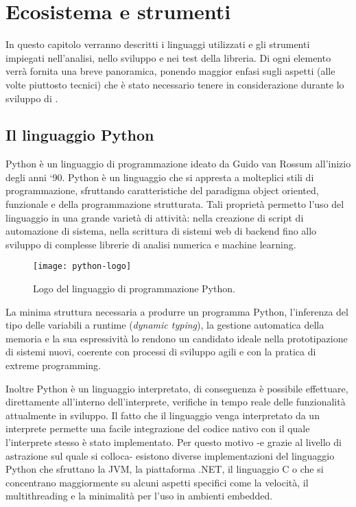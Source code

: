 \chapter{Ecosistema e strumenti}
\label{ch:ecosistema}
In questo capitolo verranno descritti i linguaggi utilizzati e gli
strumenti impiegati nell'analisi, nello sviluppo e nei test della libreria.
Di ogni elemento verrà fornita una breve panoramica, ponendo
maggior enfasi sugli aspetti (alle volte piuttosto tecnici) che è
stato necessario tenere in considerazione durante lo sviluppo
di \pygfa.

\section{Il linguaggio Python}
\nocite{wiki-python}
Python è un linguaggio di programmazione ideato da Guido van Rossum
all'inizio degli anni `90. Python è un linguaggio che si appresta a molteplici
stili di programmazione, sfruttando caratteristiche del paradigma object
oriented, funzionale e della programmazione strutturata.
Tali proprietà permetto l'uso del linguaggio in una grande varietà di attività:
nella creazione di script di automazione di sistema, nella scrittura di
sistemi web di backend fino allo sviluppo di complesse librerie di analisi numerica
e machine learning.

\begin{wrapfigure} {O} {0.35\textwidth}
	\begin{centering}	
		\texttt{[image: python-logo]}
		\caption[Logo Python]{Logo del linguaggio di programmazione Python.}
	\end{centering}
\end{wrapfigure}
La minima struttura necessaria a produrre un programma Python,
l'inferenza del tipo delle variabili a runtime (\emph{dynamic typing}),
la gestione automatica della memoria e la sua espressività lo rendono
un candidato ideale nella prototipazione di sistemi nuovi, coerente con
processi di sviluppo agili e con la pratica di extreme programming.

Inoltre Python è un linguaggio interpretato, di conseguenza è possibile
effettuare, direttamente all'interno dell'interprete, verifiche in tempo
reale delle funzionalità attualmente in sviluppo.
Il fatto che il linguaggio venga interpretato
da un interprete permette una facile integrazione del codice nativo
con il quale l'interprete stesso è stato implementato.
Per questo motivo -e grazie al livello di astrazione sul quale si colloca-
esistono diverse implementazioni del linguaggio Python
che sfruttano la JVM, la piattaforma .NET, il linguaggio C o che si
concentrano maggiormente su alcuni aspetti specifici come la velocità,
il multithreading e la minimalità per l'uso in ambienti embedded.

